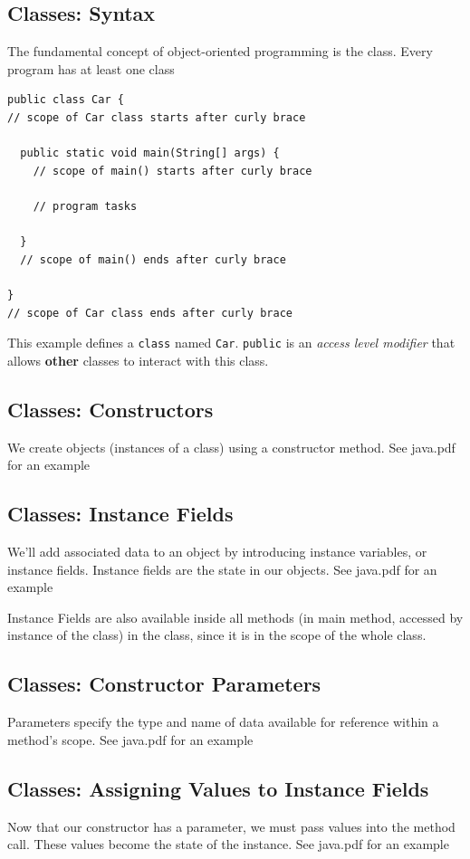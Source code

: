 \documentclass[a4paper, 12pt]{article}
\begin{document}
\subsection{Classes: Syntax}
The fundamental concept of object-oriented programming is the class. Every program has at least one class
\begin{verbatim}
public class Car {
// scope of Car class starts after curly brace

  public static void main(String[] args) {
    // scope of main() starts after curly brace

    // program tasks

  }
  // scope of main() ends after curly brace

}
// scope of Car class ends after curly brace
\end{verbatim}
This example defines a \verb|class| named \verb|Car|. \verb|public| is an \textit{access level modifier} that allows \textbf{other} classes to interact with this class.

\subsection{Classes: Constructors}
We create objects (instances of a class) using a constructor method. See java.pdf for an example

\subsection{Classes: Instance Fields}
We'll add associated data to an object by introducing instance variables, or instance fields. Instance fields are the state in our objects. See java.pdf for an example

Instance Fields are also available inside all methods {\color{red}(in main method, accessed by instance of the class)} in the class, since it is in the scope of the whole class.

\subsection{Classes: Constructor Parameters}
Parameters specify the type and name of data available for reference within a method's scope. See java.pdf for an example

\subsection{Classes: Assigning Values to Instance Fields}
Now that our constructor has a parameter, we must pass values into the method call. These values become the state of the instance. See java.pdf for an example
\end{document}

